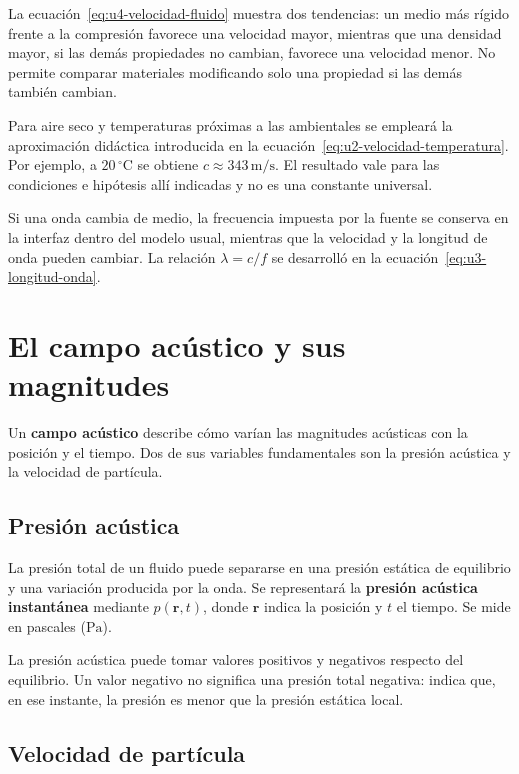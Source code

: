La ecuación~\eqref{eq:u4-velocidad-fluido} muestra dos tendencias: un medio más
rígido frente a la compresión favorece una velocidad mayor, mientras que una
densidad mayor, si las demás propiedades no cambian, favorece una velocidad
menor. No permite comparar materiales modificando solo una propiedad si las
demás también cambian.

Para aire seco y temperaturas próximas a las ambientales se empleará la
aproximación didáctica introducida en la
ecuación~\eqref{eq:u2-velocidad-temperatura}. Por ejemplo, a
\(20\,^{\circ}\text{C}\) se obtiene \(c\approx343\,\text{m}/\text{s}\). El
resultado vale para las condiciones e hipótesis allí indicadas y no es una
constante universal.

Si una onda cambia de medio, la frecuencia impuesta por la fuente se conserva
en la interfaz dentro del modelo usual, mientras que la velocidad y la longitud
de onda pueden cambiar. La relación \(\lambda=c/f\) se desarrolló en la
ecuación~\eqref{eq:u3-longitud-onda}.

\section{El campo acústico y sus magnitudes}
\label{sec:u4-campo-magnitudes}

Un \textbf{campo acústico} describe cómo varían las magnitudes acústicas con la
posición y el tiempo. Dos de sus variables fundamentales son la presión
acústica y la velocidad de partícula.

\subsection{Presión acústica}
\label{sec:u4-presion}

La presión total de un fluido puede separarse en una presión estática de
equilibrio y una variación producida por la onda. Se representará la
\textbf{presión acústica instantánea} mediante \(p(\mathbf r,t)\), donde
\(\mathbf r\) indica la posición y \(t\) el tiempo. Se mide en pascales
(\(\text{Pa}\)).

La presión acústica puede tomar valores positivos y negativos respecto del
equilibrio. Un valor negativo no significa una presión total negativa: indica
que, en ese instante, la presión es menor que la presión estática local.

\subsection{Velocidad de partícula}
\label{sec:u4-velocidad-particula}

